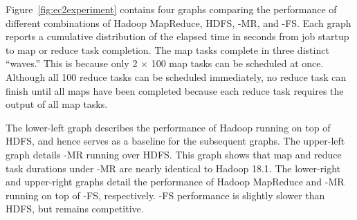 Figure~\ref{fig:ec2experiment} contains four graphs comparing the performance of
different combinations of Hadoop MapReduce, HDFS, \BOOM-MR, and \BOOM-FS\@. Each
graph reports a cumulative distribution of the elapsed time in seconds from job
startup to map or reduce task completion. The map tasks complete in three
distinct ``waves.'' This is because only 2 $\times$ 100 map tasks can be
scheduled at once. Although all 100 reduce tasks can be scheduled immediately,
no reduce task can finish until all maps have been completed because each reduce
task requires the output of all map tasks.

The lower-left graph describes the performance of Hadoop running on top of HDFS,
and hence serves as a baseline for the subsequent graphs. The upper-left graph
details \BOOM-MR running over HDFS\@. This graph shows that map and reduce task
durations under \BOOM-MR are nearly identical to Hadoop 18.1. The lower-right
and upper-right graphs detail the performance of Hadoop MapReduce and \BOOM-MR
running on top of \BOOM-FS, respectively. \BOOM-FS performance is slightly
slower than HDFS, but remains competitive.



